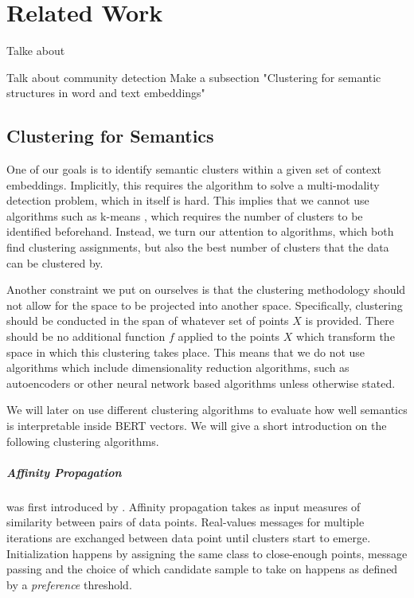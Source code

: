 \documentclass[a4paper,12pt,twoside,openright]{report}
\begin{document}
\chapter{Related Work}\label{section:RelatedWork} 

Talke about \cite{mccarthy16}

Talk about community detection 
Make a subsection "Clustering for semantic structures in word and text embeddings"

\section{Clustering for Semantics}\label{section_clustering}

One of our goals is to identify semantic clusters within a given set of context embeddings.
Implicitly, this requires the algorithm to solve a multi-modality detection problem, which in itself is hard.
This implies that we cannot use algorithms such as k-means \cite{lloyd57, macqueen67}, which requires the number of clusters to be identified beforehand.
Instead, we turn our attention to algorithms, which both find clustering assignments, but also the best number of clusters that the data can be clustered by.

Another constraint we put on ourselves is that the clustering methodology should not allow for the space to be projected into another space.
Specifically, clustering should be conducted in the span of whatever set of points $X$ is provided.
There should be no additional function $f$ applied to the points $X$ which transform the space in which this clustering takes place.
This means that we do not use algorithms which include dimensionality reduction algorithms, such as autoencoders or other neural network based algorithms unless otherwise stated.

We will later on use different clustering algorithms to evaluate how well semantics is interpretable inside BERT vectors.
We will give a short introduction on the following clustering algorithms.

\paragraph{Affinity Propagation} was first introduced by \cite{frey07}.
Affinity propagation takes as input measures of similarity between pairs of data points. 
Real-values messages for multiple iterations are exchanged between data point until clusters start to emerge.
Initialization happens by assigning the same class to close-enough points, message passing and the choice of which candidate sample to take on happens as defined by a \textit{preference} threshold.
\end{document}

